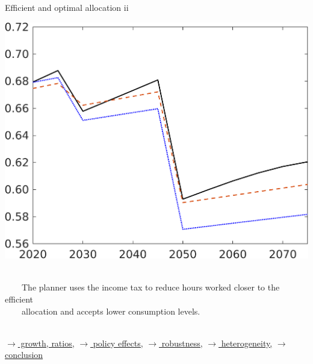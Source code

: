 \documentclass[11pt,aspectratio=169]{beamer}
\newcommand{\ar}{$\Rightarrow$ \ }
\begin{document}
\begin{frame}{Efficient and optimal allocation ii }
\begin{minipage}[]{0.3\textwidth}
\end{minipage}
	\begin{minipage}[]{0.3\textwidth}
	\includegraphics[width=1\textwidth]{../codding_model/own_basedOnFried/optimalPol_elastS_DisuSci/figures/all_1705/C_CompEffOPT_T_NoTaus_spillover0_noskill0_sep1_BN0_ineq0_red0_xgrowth0_zero0_countec0_etaa0.79_lgd0.png}
\end{minipage}

\vspace{6mm}
\begin{block}{}
	\ \\ 	\ \ \ \ 
	 The planner uses the income tax to reduce hours worked closer to the efficient \\ \ \ \ \  allocation and accepts lower consumption levels. \\ \ 
\end{block}

%	
	\vspace{-3mm}
\hfill
\hyperlink{effalloOthers}{\tiny{$\rightarrow$ growth, ratios,}}
\hyperlink{disen}{\tiny{$\rightarrow$ policy effects,}}
\hyperlink{robustness}{\tiny{$\rightarrow$ robustness,}}
\hyperlink{heterogeneity}{\tiny{$\rightarrow$ heterogeneity,}}
\hyperlink{conc}{\tiny{$\rightarrow$ conclusion}}
 

\end{frame}
\end{document}

